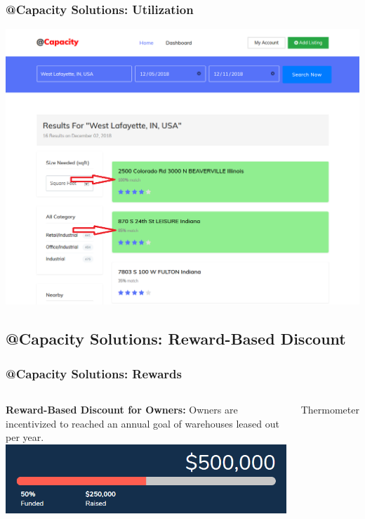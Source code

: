 \documentclass{beamer}
\begin{document}
\begin{frame}
\frametitle{@Capacity Solutions: Utilization}
\includegraphics[keepaspectratio=true,width=.8\paperwidth]{utilization.png}
\end{frame}


\subsection{@Capacity Solutions: Reward-Based Discount}

\begin{frame}
\frametitle{@Capacity Solutions: Rewards}
\begin{columns}[c] %

\textbf{Reward-Based Discount for Owners: } Owners are incentivized to reached an annual goal of warehouses leased out per year. 
\includegraphics[keepaspectratio=true,width=.5\paperwidth]{thermometer.png}\\
\begin{center} 
Thermometer
\end{center}
\end{columns}
\end{frame}
\end{document}
